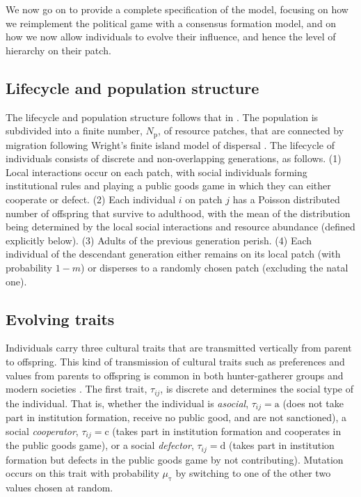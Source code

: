 \documentclass{rstb}
\begin{document}
\begin{linenumbers}
We now go on to provide a complete specification of the model, focusing on how we reimplement the political game with a consensus formation model, and on how we now allow individuals to evolve their influence, and hence the level of hierarchy on their patch.


\subsection*{Lifecycle and population structure}

The lifecycle and population structure follows that in \cite{Powers:2013:a}. The population is subdivided into a finite number, $N_\mathrm{p}$, of resource patches, that are connected by migration following Wright's finite island model of dispersal \cite{Wright:1931:a}. The lifecycle of individuals consists of discrete and non-overlapping generations, as follows. (1) Local interactions occur on each patch, with social individuals forming institutional rules and playing a public goods game in which they can either cooperate or defect. (2) Each individual $i$ on patch $j$ has a Poisson distributed number of offspring that survive to adulthood, with the mean of the distribution being determined by the local social interactions and resource abundance (defined explicitly below). (3) Adults of the previous generation perish. (4) Each individual of the descendant generation either remains on its local patch (with probability $1-m$) or disperses to a randomly chosen patch (excluding the natal one). 

\subsection*{Evolving traits}

Individuals carry three cultural traits that are transmitted vertically from parent to offspring. This kind of transmission of cultural traits such as preferences and values from parents to offspring is common in both hunter-gatherer groups \cite{Hewlett:2011:a} and modern societies \cite{Cavalli-Sforza:1981:a}. The first trait, $\tau_{ij}$, is discrete and determines the social type of the individual. That is, whether the individual is \emph{asocial}, $\tau_{ij}=\mathrm{a}$ (does not take part in institution formation, receive no public good, and are not sanctioned), a social \emph{cooperator}, $\tau_{ij}=\mathrm{c}$ (takes part in institution formation and cooperates in the public goods game), or a social \emph{defector}, $\tau_{ij}=\mathrm{d}$ (takes part in institution formation but defects in the public goods game by not contributing). Mutation occurs on this trait with probability $\mu_\mathrm{\tau}$ by switching to one of the other two values chosen at random.


\end{linenumbers}
\end{document}
